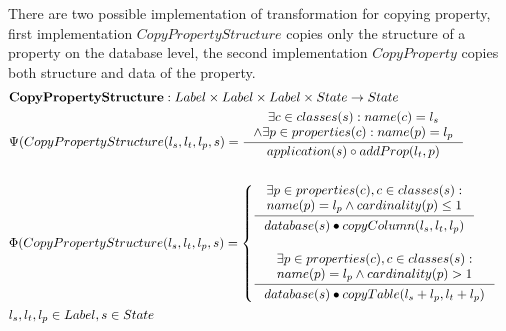 \documentclass[11pt]{article}
\begin{document}
There are two possible implementation of transformation for copying property, first implementation $CopyPropertyStructure$ copies only the structure of a property on the database level, the second implementation $CopyProperty $ copies both structure and data of the property.
\begin{align*}
&	\mathbf{CopyPropertyStructure} : Label \times Label \times Label \times State \rightarrow State \\
&	\Psi(CopyPropertyStructure(l_s, l_t, l_p, s) = \inference{\exists c \in classes(s) : name(c) = l_s \\ \wedge \exists p \in properties(c) : name(p) = l_p }{application(s) \circ addProp(l_t, p)} 
	\\\\
&	\Phi(CopyPropertyStructure(l_s, l_t, l_p, s) = \begin{cases}
    \inference{\exists p \in properties(c), c \in classes(s) : \\ name(p) = l_p \wedge cardinality(p) \leq 1 }{\begin{gathered}
			database(s) \bullet copyColumn(l_s, l_t, l_p) 			\end{gathered}} \\ \\
		\inference{\exists p \in properties(c), c \in classes(s) : \\ name(p) = l_p \wedge cardinality(p) > 1}{\begin{gathered}
			database(s) \bullet copyTable(l_s + l_p, l_t + l_p) 			\end{gathered}}
 \end{cases}\\
& l_s, l_t, l_p \in Label, s \in State
\end{align*}
\end{document}
